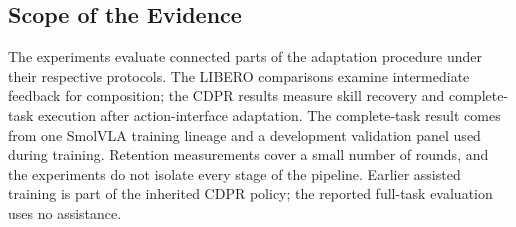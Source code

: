\subsection{Scope of the Evidence}
The experiments evaluate connected parts of the adaptation procedure under their respective protocols. The LIBERO comparisons examine intermediate feedback for composition; the CDPR results measure skill recovery and complete-task execution after action-interface adaptation. The complete-task result comes from one SmolVLA training lineage and a development validation panel used during training. Retention measurements cover a small number of rounds, and the experiments do not isolate every stage of the pipeline. Earlier assisted training is part of the inherited CDPR policy; the reported full-task evaluation uses no assistance.
